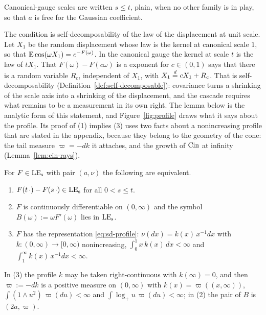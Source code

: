 Canonical-gauge scales are written $s \le t$, plain, when no other family is in play,
so that $a$ is free for the Gaussian coefficient.

The condition is self-decomposability of the law of the displacement at unit scale. Let
$X_1$ be the random displacement whose law is the kernel at canonical scale $1$, so that
$\mathbb{E}\cos(\omega X_1) = e^{-F(\omega)}$. In the
canonical gauge the kernel at scale $t$ is the law of $tX_1$. That $F(\omega) - F(c\omega)$ is
a \Levy{} exponent for $c \in (0,1)$ says that there is a random variable $R_c$, independent of
$X_1$, with $X_1 \stackrel{d}{=} cX_1 + R_c$. That is self-decomposability
(Definition~\ref{def:self-decomposable}): covariance turns a shrinking of the scale axis into
a shrinking of the displacement, and the cascade requires what remains to be a measurement in
its own right. The lemma below is the analytic form of this statement, and
Figure~\ref{fig:profile} draws what it says about the profile. Its proof of (1) implies (3)
uses two facts about a nonincreasing profile that are stated in the appendix, because they
belong to the geometry of the cone: the tail measure $\varpi = -dk$ it attaches, and the
growth of $\operatorname{Cin}$ at infinity (Lemma~\ref{lem:cin-rays}).



\begin{lemma}\label{lem:selfdecomposable-exponents}
For $F \in \mathrm{LE}_{\mathrm{s}}$ with pair $(a,\nu)$ the following are equivalent.
\begin{enumerate}
\item $F(t\,\cdot) - F(s\,\cdot) \in \mathrm{LE}_{\mathrm{s}}$ for all $0 < s \le t$.
\item $F$ is continuously differentiable on $(0,\infty)$ and the symbol
$B(\omega) := \omega F'(\omega)$ lies in $\mathrm{LE}_{\mathrm{s}}$.
\item $F$ has the representation \ref{eq:sd-profile}: $\nu(dx) = k(x)\,x^{-1}dx$ with
$k : (0,\infty) \to [0,\infty)$ nonincreasing, $\int_0^1 x\,k(x)\,dx < \infty$ and
$\int_1^\infty k(x)\,x^{-1}dx < \infty$.
\end{enumerate}
In (3) the profile $k$ may be taken right-continuous with $k(\infty) = 0$, and then
$\varpi := -dk$ is a positive measure on $(0,\infty)$ with $k(x) = \varpi((x,\infty))$,
$\int (1 \wedge u^2)\,\varpi(du) < \infty$ and $\int \log_+ u\,\varpi(du) < \infty$; in (2) the
pair of $B$ is $(2a,\varpi)$.
\end{lemma}

